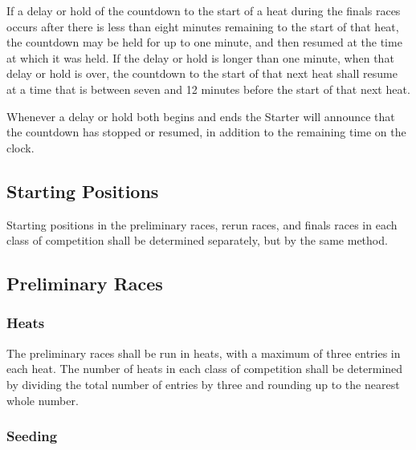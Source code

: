 	If a delay or hold of the countdown to the start of a heat during the finals races occurs after there is less than eight minutes remaining to the start of that heat, the countdown may be held for up to one minute, and then resumed at the time at which it was held. If the delay or hold is longer than one minute, when that delay or hold is over, the countdown to the start of that next heat shall resume at a time that is between seven and 12 minutes before the start of that next heat.

	Whenever a delay or hold both begins and ends the Starter will announce that the countdown has stopped or resumed, in addition to the remaining time on the clock.

\subsection{Starting Positions}

	Starting positions in the preliminary races, rerun races, and finals races in each class of competition shall be determined separately, but by the same method.

\subsection{Preliminary Races}

\subsubsection{Heats}

	The preliminary races shall be run in heats, with a maximum of three entries in each heat. The number of heats in each class of competition shall be determined by dividing the total number of entries by three and rounding up to the nearest whole number.

\subsubsection{Seeding}

